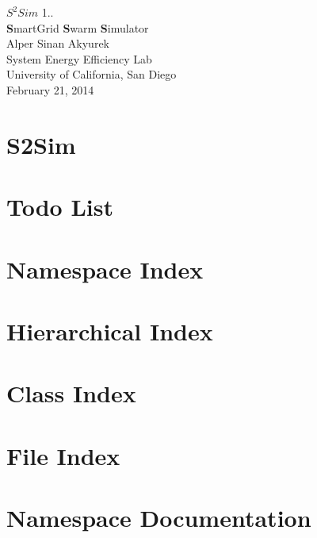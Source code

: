 \documentclass[twoside]{book}
\newcommand{\clearemptydoublepage}{%
  \newpage{\pagestyle{empty}\cleardoublepage}%
}
\begin{document}
\hypersetup{pageanchor=false}
\begin{titlepage}
\vspace*{7cm}
\begin{center}%
{\Huge $S^{2}Sim$ \large 1.. }\\
\vspace*{1cm}
{\Huge \textbf{S}martGrid \textbf{S}warm \textbf{S}imulator}\\
\vspace*{1cm}
{\Large Alper Sinan Akyurek}\\
\vspace*{1.5cm}
{\large System Energy Efficiency Lab}\\
\vspace*{0.5cm}
{\normalsize University of California, San Diego}\\
\vspace*{0.5cm}
{\small February 21, 2014}\\
\end{center}
\end{titlepage}
\clearemptydoublepage
\tableofcontents
\clearemptydoublepage
{}
\hypersetup{pageanchor=true}

\chapter{S2\-Sim}
\label{index}\hypertarget{index}{}
\chapter{Todo List}
\label{todo}
\hypertarget{todo}{}

\chapter{Namespace Index}

\chapter{Hierarchical Index}

\chapter{Class Index}

\chapter{File Index}

\chapter{Namespace Documentation}



\end{document}

